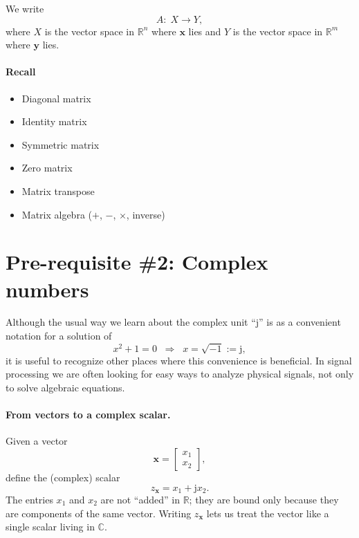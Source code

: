 \documentclass{ee102_notes}
\begin{document}
We write
\[
A:\; X \to Y,
\]
where $X$ is the vector space in $\mathbb{R}^n$ where $\mathbf{x}$ lies and $Y$ is the vector space in $\mathbb{R}^m$ where $\mathbf{y}$ lies.

\paragraph{Recall}
\begin{itemize}
  \item Diagonal matrix
  \item Identity matrix
  \item Symmetric matrix
  \item Zero matrix
  \item Matrix transpose
  \item Matrix algebra ($+$, $-$, $\times$, inverse)
\end{itemize}
\section{Pre-requisite \#2: Complex numbers}

Although the usual way we learn about the complex unit ``$\mathrm{j}$'' is as
a convenient notation for a solution of
\[
x^{2}+1=0 \;\;\Rightarrow\;\; x=\sqrt{-1}:=\mathrm{j},
\]
it is useful to recognize other places where this convenience is beneficial.
In signal processing we are often looking for easy ways to analyze physical
signals, not only to solve algebraic equations.

\paragraph{From vectors to a complex scalar.}
Given a vector
\[
\mathbf{x}=\begin{bmatrix}x_1\\ x_2\end{bmatrix},
\]
define the (complex) scalar
\[
z_{\mathbf{x}}=x_1+\mathrm{j}x_2.
\]
The entries $x_1$ and $x_2$ are not ``added'' in $\mathbb{R}$; they are bound
only because they are components of the same vector. Writing $z_{\mathbf{x}}$
lets us treat the vector like a single scalar living in $\mathbb{C}$.
\end{document}
